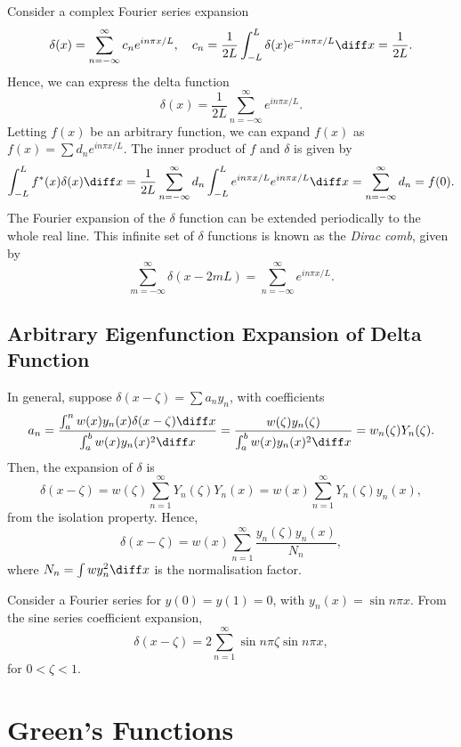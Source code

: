 \documentclass[12pt]{article}
\begin{document}
Consider a complex Fourier series expansion
\[
	\delta(x) = \sum_{n = -\infty}^{\infty}c_n e^{in\pi x/L}, \quad c_n = \frac{1}{2L} \int_{-L}^{L} \delta(x) e^{-in\pi x/L} \diff x = \frac{1}{2L}
.\]
Hence, we can express the delta function
\[
	\delta(x) = \frac{1}{2L} \sum_{n = -\infty}^{\infty}e^{in \pi x/L}
.\]
Letting $f(x)$ be an arbitrary function, we can expand $f(x)$ as $f(x) = \sum d_n e^{in \pi x/L}$. The inner product of $f$ and $\delta$ is given by
\[
	\int_{-L}^{L}f^{\ast}(x) \delta(x) \diff x = \frac{1}{2L} \sum_{n = -\infty}^{\infty}d_n \int_{-L}^{L} e^{in \pi x/L}e^{in \pi x/L}\diff x = \sum_{n = -\infty}^{\infty} d_n = f(0)
.\]
The Fourier expansion of the $\delta$ function can be extended periodically to the whole real line. This infinite set of $\delta$ functions is known as the \textit{Dirac comb}, given by
\[
	\sum_{m = -\infty}^{\infty} \delta(x - 2mL) = \sum_{n = -\infty}^{\infty} e^{in \pi x/L}
.\]

\subsection{Arbitrary Eigenfunction Expansion of Delta Function}%
\label{sub:arbitrary_eigenfunction_expansion_of_delta_function}

In general, suppose $\delta(x - \zeta) = \sum a_n y_n$, with coefficients
\[
	a_n = \frac{\int_{a}^{n} w(x) y_n(x) \delta(x - \zeta)\diff x}{\int_{a}^{b} w(x) y_n(x)^2 \diff x} = \frac{w(\zeta)y_n(\zeta)}{\int_{a}^{b} w(x) y_n(x)^2\diff x} = w_n(\zeta) Y_n(\zeta)
.\]
Then, the expansion of $\delta$ is
\[
	\delta(x - \zeta) = w(\zeta) \sum_{n = 1}^{\infty} Y_n(\zeta) Y_n(x) = w(x) \sum_{n = 1}^{\infty} Y_n(\zeta)y_n(x)
,\]
from the isolation property. Hence,
\[
	\delta(x - \zeta) = w(x) \sum_{n = 1}^{\infty}\frac{y_n(\zeta)y_n(x)}{N_n}
,\]
where $N_n = \int w y_n^2 \diff x$ is the normalisation factor.

\begin{exbox}
	Consider a Fourier series for $y(0) = y(1) = 0$, with $y_n(x) = \sin n \pi x$. From the sine series coefficient expansion,
	\[
		\delta(x - \zeta) = 2 \sum_{n = 1}^{\infty} \sin n \pi \zeta \sin n \pi x
	,\]
	for $0 < \zeta < 1$.
\end{exbox}

\newpage

\section{Green's Functions}%
\label{sec:green_s_functions}
\end{document}

